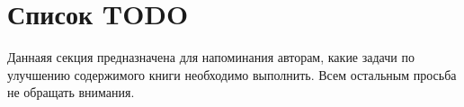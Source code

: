 \section*{Список TODO}

Даннаяя секция предназначена для напоминания авторам, какие задачи по улучшению содержимого книги необходимо выполнить. Всем остальным просьба не обращать внимания.

